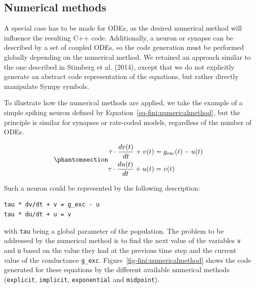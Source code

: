 \documentclass[
  11pt,
  a4paper,
]{scrbook}
\begin{document}
\subsection{Numerical methods}\label{sec-numerical-methods}

A special case has to be made for ODEs, as the desired numerical method
will influence the resulting C++ code. Additionally, a neuron or synapse
can be described by a set of coupled ODEs, so the code generation must
be performed globally depending on the numerical method. We retained an
approach similar to the one described in Stimberg et al. (2014), except
that we do not explicitly generate an abstract code representation of
the equations, but rather directly manipulate Sympy symbols.

To illustrate how the numerical methods are applied, we take the example
of a simple spiking neuron defined by
Equation~\ref{eq-fini:numericalmethod}, but the principle is similar for
synapses or rate-coded models, regardless of the number of ODEs.

\begin{equation}\phantomsection\label{eq-fini:numericalmethod}{
\begin{aligned}
\tau \cdot \frac{dv(t)}{dt} + v(t) &= g_\text{exc} (t) - u(t) \\
\tau \cdot \frac{du(t)}{dt} + u(t) &= v(t)
\end{aligned}
}\end{equation}

Such a neuron could be represented by the following description:

\begin{verbatim}
tau * dv/dt + v = g_exc - u
tau * du/dt + u = v
\end{verbatim}

with \texttt{tau} being a global parameter of the population. The
problem to be addressed by the numerical method is to find the next
value of the variables \texttt{v} and \texttt{u} based on the value they
had at the previous time step and the current value of the conductance
\texttt{g\_exc}. Figure~\ref{fig-fini:numericalmethod} shows the code
generated for these equations by the different available numerical
methods (\texttt{explicit}, \texttt{implicit}, \texttt{exponential} and
\texttt{midpoint}).
\end{document}
